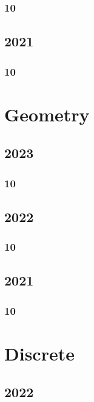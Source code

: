 \documentclass[11pt]{book}
\begin{document}
\subsection{10}

\section{2021}
\subsection{10}


\chapter{Geometry}
\section{2023}
\subsection{10}


\section{2022}
\subsection{10}


\section{2021}
\subsection{10}


%
%
%

\chapter{Discrete}
\section{2022}
\end{document}
